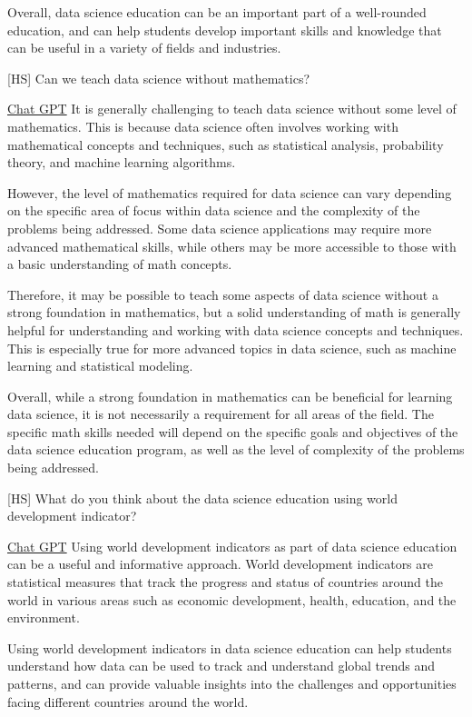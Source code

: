 \documentclass[
]{book}
\theoremstyle{definition}
\theoremstyle{definition}
\theoremstyle{definition}
\theoremstyle{definition}
\theoremstyle{remark}
\begin{document}
Overall, data science education can be an important part of a well-rounded education, and can help students develop important skills and knowledge that can be useful in a variety of fields and industries.

{[}HS{]} Can we teach data science without mathematics?

\protect\hyperlink{chatgpt}{Chat GPT} It is generally challenging to teach data science without some level of mathematics. This is because data science often involves working with mathematical concepts and techniques, such as statistical analysis, probability theory, and machine learning algorithms.

However, the level of mathematics required for data science can vary depending on the specific area of focus within data science and the complexity of the problems being addressed. Some data science applications may require more advanced mathematical skills, while others may be more accessible to those with a basic understanding of math concepts.

Therefore, it may be possible to teach some aspects of data science without a strong foundation in mathematics, but a solid understanding of math is generally helpful for understanding and working with data science concepts and techniques. This is especially true for more advanced topics in data science, such as machine learning and statistical modeling.

Overall, while a strong foundation in mathematics can be beneficial for learning data science, it is not necessarily a requirement for all areas of the field. The specific math skills needed will depend on the specific goals and objectives of the data science education program, as well as the level of complexity of the problems being addressed.

{[}HS{]} What do you think about the data science education using world development indicator?

\protect\hyperlink{chatgpt}{Chat GPT} Using world development indicators as part of data science education can be a useful and informative approach. World development indicators are statistical measures that track the progress and status of countries around the world in various areas such as economic development, health, education, and the environment.

Using world development indicators in data science education can help students understand how data can be used to track and understand global trends and patterns, and can provide valuable insights into the challenges and opportunities facing different countries around the world.
\end{document}
